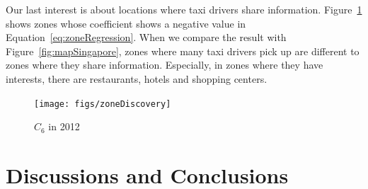\documentclass{article}
\begin{document}
Our last interest is about locations where taxi drivers share information. Figure~\ref{fig:zoneDiscovery} shows zones whose coefficient shows a negative value in Equation~\ref{eq:zoneRegression}. When we compare the result with Figure~\ref{fig:mapSingapore}, zones where many taxi drivers pick up are different to zones where they share information. Especially, in zones where they have interests, there are restaurants, hotels and shopping centers.


\begin{figure} [h]
  \centering
  \texttt{[image: figs/zoneDiscovery]}
  \caption{$C_6$ in 2012}
  \label{fig:zoneDiscovery}
\end{figure}


\section{Discussions and Conclusions} \label{sec:discuCons}







\end{document}
